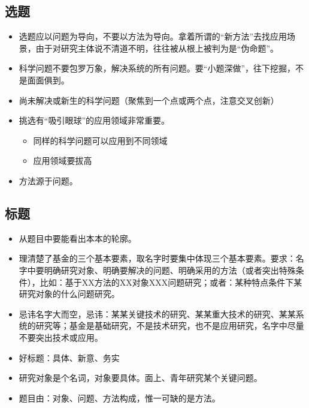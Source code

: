 \subsection{选题}
\begin{itemize}
\item 选题应以问题为导向，不要以方法为导向。拿着所谓的“新方法”去找应用场景，由于对研究主体说不清道不明，往往被从根上被判为是“伪命题”。

\item 科学问题不要包罗万象，解决系统的所有问题。要“小题深做”，往下挖掘，不是面面俱到。

\item 尚未解决或新生的科学问题（聚焦到一个点或两个点，注意交叉创新）

\item 挑选有“吸引眼球”的应用领域非常重要。
	\begin{itemize}
	\item 同样的科学问题可以应用到不同领域
	\item 应用领域要拔高
	\end{itemize}
\item 方法源于问题。
\end{itemize}



\subsection{标题}
\begin{itemize}
\item {\color{red} 从题目中要能看出本本的轮廓。}

\item 理清楚了基金的三个基本要素，取名字时要集中体现三个基本要素。要求：名字中要明确研究对象、明确要解决的问题、明确采用的方法（或者突出特殊条件），比如：基于XX方法的XX对象XXX问题研究；或者：某种特点条件下某研究对象的什么问题研究。

\item 忌讳名字大而空，忌讳：某某关键技术的研究、某某重大技术的研究、某某系统的研究等；基金是基础研究，不是技术研究，也不是应用研究，名字中尽量不要突出技术或应用。

\item 好标题：具体、新意、务实

\item 研究对象是个名词，对象要具体。面上、青年研究某个关键问题。

\item 题目由：对象、问题、方法构成，惟一可缺的是方法。
\end{itemize}





